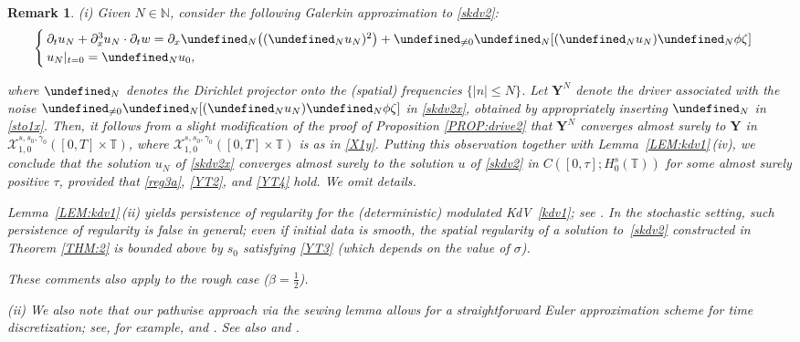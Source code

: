 \documentclass[letterpaper, 11pt,  reqno]{amsart}
\newtheorem{remark}[theorem]{Remark}
\newcommand{\1}{\hspace{0.5mm}\textup{I}\hspace{0.5mm}}
\newcommand{\noi}{\noindent}
\newcommand{\R}{\mathbb{R}}
\newcommand{\T}{\mathbb{T}}
\let\P= \undefined
\newcommand{\P}{\mathbf{P}}
\newcommand{\CC}{\mathcal{C}}
\newcommand{\be}{\beta}
\newcommand{\g}{\gamma}
\newcommand{\s}{\sigma}
\newcommand{\dx}{\partial_x}
\newcommand{\dt}{\partial_t}
\newcommand{\N}{\mathbb{N}}
\newcommand{\cX}{\mathcal{X}}
\newcommand{\uu}{\mathbf{u}}
\newcommand{\YY}{\mathbf{Y}}
\numberwithin{equation}{section}
\numberwithin{theorem}{section}
\begin{document}
\begin{remark}\rm

(i)
Given $N \in \N$, consider the following Galerkin approximation to \eqref{skdv2}:
\begin{align}
\begin{cases}
\dt u_N+  \dx^3 u_N \cdot \dt w = \dx \P_N\big((\P_N u_N)^2 \big)+ \P_{\ne 0}
\P_N [(\P_N u_N) \P_N \phi \zeta]\\
u_N|_{t = 0} = \P_N u_0,
\end{cases}
\label{skdv2x}
\end{align}

\noi
where $\P_N$
 denotes  the Dirichlet projector onto the (spatial) frequencies 
$\{|n| \leq N\}$.
Let $\YY^N$ denote the driver associated with the noise 
$\P_{\ne 0}
\P_N [(\P_N u_N) \P_N \phi \zeta]$ in \eqref{skdv2x},
obtained by appropriately
inserting $\P_N$ in \eqref{sto1x}.
Then, it follows from a slight modification of the proof of Proposition \ref{PROP:drive2}
that $\YY^N$ converges almost surely to $\YY$ in 
$\cX^{s, s_0, \g_0}_{1, 0} ([0, T]\times \T)$, 
where 
$\cX^{s, s_0, \g_0}_{1, 0} ([0, T]\times \T)$ is as in \eqref{X1y}.
Putting this observation together with Lemma~\ref{LEM:kdv1}\,(iv), 
we conclude that the solution $u_N$
of \eqref{skdv2x}
converges almost surely to the solution $u$ of \eqref{skdv2}
in $C([0, \tau]; H^s_0(\T))$
for some almost surely positive $\tau$,  
provided that  
\eqref{reg3a}, \eqref{YT2}, and \eqref{YT4}
hold.
We omit details.

Lemma~\ref{LEM:kdv1}\,(ii) yields
 persistence of regularity 
for the (deterministic) modulated KdV~\eqref{kdv1};
see \cite[Remark 1.4]{CGLLO1}.
In the stochastic setting, such 
persistence of regularity is false in general;
even if initial data is smooth, 
the spatial regularity of a solution to~\eqref{skdv2}
constructed in Theorem \ref{THM:2}
is 
bounded above by $s_0$ satisfying \eqref{YT3}
(which depends on the value of $\s$).


%
%
%


These 
comments also apply to  the rough case ($\be = \frac 12$).


\smallskip

\noi
(ii)
We also note that 
our pathwise approach via the sewing lemma
allows for a straightforward Euler approximation scheme
for time discretization; see, for example,  \cite[Subsection 2.3]{CG1}
and \cite[Subsection 3.3]{Gub12}.
See also 
 \cite[Remark 1.17]{GLLO}
and \cite{CFO}.


\end{remark}
\end{document}
